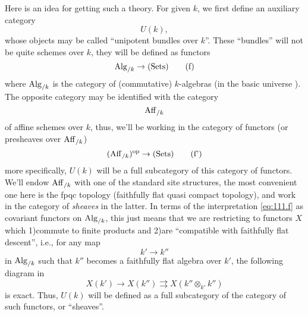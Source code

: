 Here is an idea for getting such a theory. For given $k$, we first
define an auxiliary category
\begin{equation}
  \label{eq:111.e}
  U(k),\tag{e}
\end{equation}
whose objects may be called ``unipotent bundles over $k$''. These
``bundles'' will not be quite schemes over $k$, they will be defined
as functors
\begin{equation}
  \label{eq:111.f}
  \operatorname{Alg}_{/k}\to{\ensuremath{(\mathrm{Sets})}}\tag{f}
\end{equation}
where $\operatorname{Alg}_{/k}$ is the category of (commutative) $k$-algebras (in
the basic universe \scrU). The opposite category may be identified
with the category
\[\operatorname{Aff}_{/k}\]
of affine schemes over $k$, thus, we'll be working in the
category of functors (or presheaves over $\operatorname{Aff}_{/k}$)
\begin{equation}
  \label{eq:111.fprime}
  (\operatorname{Aff}_{/k})^{\mathrm{op}} \to {\ensuremath{(\mathrm{Sets})}}\tag{f'}
\end{equation}
more specifically, $U(k)$ will be a full subcategory of this category
of functors. We'll endow $\operatorname{Aff}_{/k}$ with one of the standard site
structures, the most convenient one here is the
fpqc topology
(faithfully flat quasi compact topology), and work in the category of
\emph{sheaves} in the latter. In terms of the interpretation
\eqref{eq:111.f} as covariant functors on $\operatorname{Alg}_{/k}$, this just means
that we are restricting to functors $X$ which 1)\enspace commute to
finite products and 2)\enspace are ``compatible with faithfully flat
descent'', i.e., for any map
\[k'\to k''\]
in $\operatorname{Alg}_{/k}$ such that $k''$ becomes a faithfully flat algebra over
$k'$, the following diagram in \Sets
\[X(k') \to X(k'') \rightrightarrows X(k'' \otimes_{k'} k'')\]
is exact. Thus, $U(k)$ will be defined as a full subcategory of the
category of such functors, or ``sheaves''.

